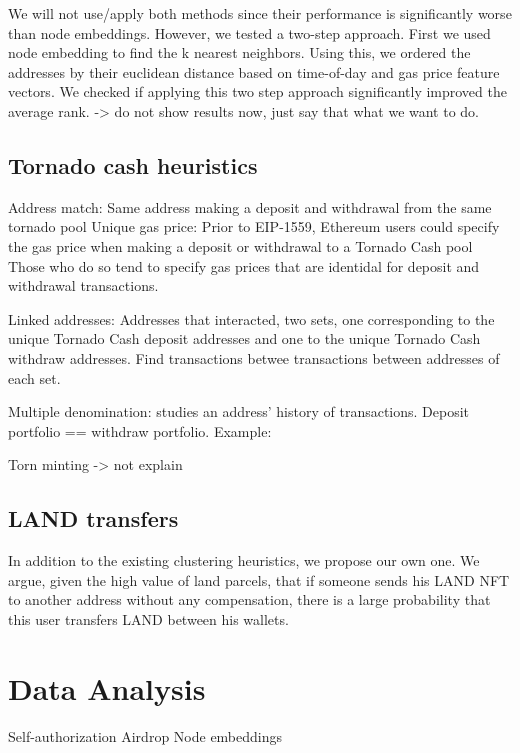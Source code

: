 \documentclass[12pt,a4paper,titlepage,oneside,english]{article}
\begin{document}
We will not use/apply both methods since their performance is significantly worse than node embeddings. However, we tested a two-step approach. First we used node embedding to find the k nearest neighbors. Using this, we ordered the addresses by their euclidean distance based on time-of-day and gas price feature vectors. We checked if applying this two step approach significantly improved the average rank. -> do not show results now, just say that what we want to do.

\subsection{Tornado cash heuristics}
Address match: Same address making a deposit and withdrawal from the same tornado pool
Unique gas price: Prior to EIP-1559, Ethereum users could specify the gas price when making a deposit or withdrawal to a Tornado Cash pool Those who do so tend to specify gas prices that are identidal for deposit and withdrawal transactions. 

Linked addresses: Addresses that interacted, two sets, one corresponding to the unique Tornado Cash deposit addresses and one to the unique Tornado Cash withdraw addresses. Find transactions betwee transactions between addresses of each set.

Multiple denomination: studies an address' history of transactions. Deposit portfolio == withdraw portfolio. Example:

Torn minting -> not explain


\subsection{LAND transfers}
In addition to the existing clustering heuristics, we propose our own one. We argue, given the high value of land parcels, that if someone sends his LAND NFT to another address without any compensation, there is a large probability that this user transfers LAND between his wallets.



\section{Data Analysis}
Self-authorization
Airdrop
Node embeddings



\end{document}
